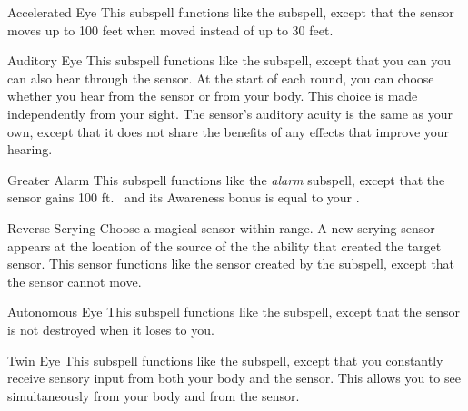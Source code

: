 \begin{ability}[\nth{2}]{Accelerated Eye}
This subspell functions like the  subspell, except that the sensor moves up to 100 feet when moved instead of up to 30 feet.
\end{ability}
\vspace{0.25em}


\begin{ability}[\nth{2}]{Auditory Eye}
This subspell functions like the  subspell, except that you can you can also hear through the sensor.
At the start of each round, you can choose whether you hear from the sensor or from your body.
This choice is made independently from your sight.
The sensor's auditory acuity is the same as your own, except that it does not share the benefits of any  effects that improve your hearing.
\end{ability}
\vspace{0.25em}


\begin{ability}[\nth{2}]{Greater Alarm}
This subspell functions like the \textit{alarm} subspell, except that the sensor gains 100 ft.\  and its Awareness bonus is equal to your .
\end{ability}
\vspace{0.25em}


\begin{ability}[\nth{2}]{Reverse Scrying}
Choose a magical sensor within \rngmed range.
A new scrying sensor appears at the location of the source of the the ability that created the target sensor.
This sensor functions like the sensor created by the  subspell, except that the sensor cannot move.
\end{ability}
\vspace{0.25em}


\begin{ability}[\nth{3}]{Autonomous Eye}
This subspell functions like the  subspell, except that the sensor is not destroyed when it loses  to you.
\end{ability}
\vspace{0.25em}


\begin{ability}[\nth{3}]{Twin Eye}
This subspell functions like the  subspell, except that you constantly receive sensory input from both your body and the sensor.
This allows you to see simultaneously from your body and from the sensor.
\end{ability}
\vspace{0.25em}


